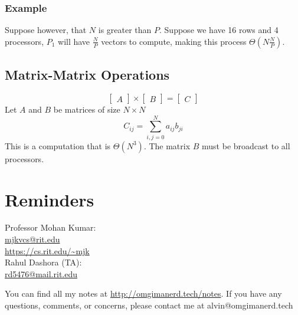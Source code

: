 \documentclass[letterpaper, 12pt]{math}
\begin{document}
\subsubsection*{Example}
Suppose however, that \( N \) is greater than \( P \). Suppose we have 16 rows
and 4 processors, \( P_1 \) will have \( \frac{N}{P} \) vectors to compute,
making this process \( \Theta(N\frac{N}{P}) \).

\subsection*{Matrix-Matrix Operations}
\[ \begin{bmatrix}A\end{bmatrix}\times
  \begin{bmatrix}B\end{bmatrix} = \begin{bmatrix}C\end{bmatrix} \]
Let \( A \) and \( B \) be matrices of size \( N\times N \)
\[ C_{ij} = \sum_{i,j=0}^{N}a_{ij}b_{ji} \]
This is a computation that is \( \Theta(N^3) \). The matrix \( B \) must be
broadcast to all processors.

\section*{Reminders}
Professor Mohan Kumar: \\
\url{mjkvcs@rit.edu} \\
\url{https://cs.rit.edu/~mjk} \\

\noindent Rahul Dashora (TA): \\
\url{rd5476@mail.rit.edu}

\begin{center}
  You can find all my notes at \url{http://omgimanerd.tech/notes}. If you have
  any questions, comments, or concerns, please contact me at
  alvin@omgimanerd.tech
\end{center}
\end{document}
